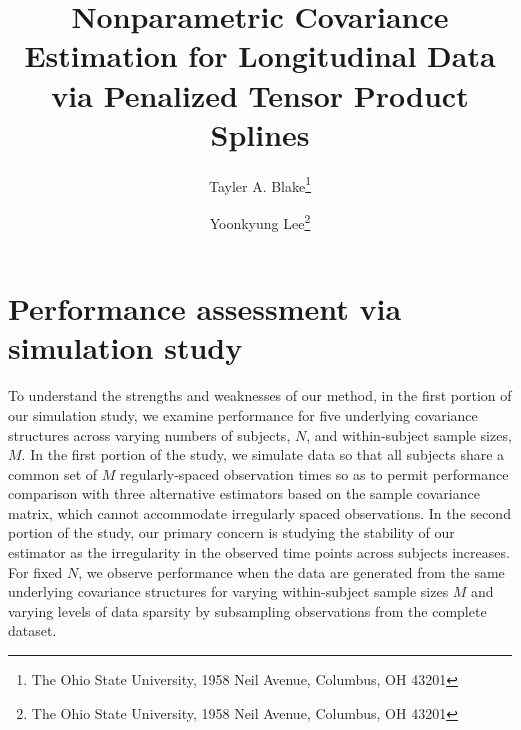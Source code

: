 \documentclass[12pt]{article}
\theoremstyle{definition}
\def\bL{\mathbf{L}}
\begin{document}
\def\bL{\mathbf{L}}



\title{ Nonparametric Covariance Estimation for Longitudinal Data via Penalized Tensor Product Splines}

\author{Tayler A. Blake\thanks{The Ohio State University, 1958 Neil Avenue, Columbus, OH 43201} \and  Yoonkyung Lee\thanks{The Ohio State University, 1958 Neil Avenue, Columbus, OH 43201}}


\maketitle

\section{Performance assessment via simulation study}

%
%

To understand the strengths and weaknesses of our method, in the first portion of our simulation study, we examine performance for five underlying covariance structures across varying numbers of subjects, $N$, and within-subject sample sizes, $M$. In the first portion of the study, we simulate data so that all subjects share a common set of $M$ regularly-spaced observation times so as to permit performance comparison with three alternative estimators based on the sample covariance matrix, which cannot accommodate irregularly spaced observations.  In the second portion of the study, our primary concern is studying the stability of our estimator as the irregularity in the observed time points across subjects increases. For fixed $N$, we observe performance when the data are generated from the same underlying covariance structures for varying within-subject sample sizes $M$ and varying levels of data sparsity by subsampling observations from the complete dataset. 
\end{document}
